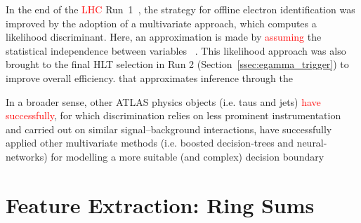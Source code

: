 In the end of the \textcolor{red}{LHC} Run~1~\cite{PERF-2016-01}, the strategy for offline electron identification was improved by the adoption of a multivariate approach, which computes a likelihood discriminant. Here, an approximation is made by \textcolor{red}{assuming} the statistical independence between variables ~\cite{kendalls_vol2b}. This likelihood approach was also brought to the final HLT selection in Run 2 (Section~\ref{ssec:egamma_trigger}) to improve overall efficiency. that approximates inference through the




In a broader sense, other ATLAS physics objects (i.e. taus and jets) \textcolor{red}{have successfully}, for
which discrimination relies on less prominent instrumentation and carried out on
similar signal--background interactions, have successfully applied other
multivariate methods (i.e. boosted decision-trees and neural-networks) for
modelling a more suitable (and complex) decision boundary

\section{Feature Extraction: Ring Sums}\label{ssec:concept}

